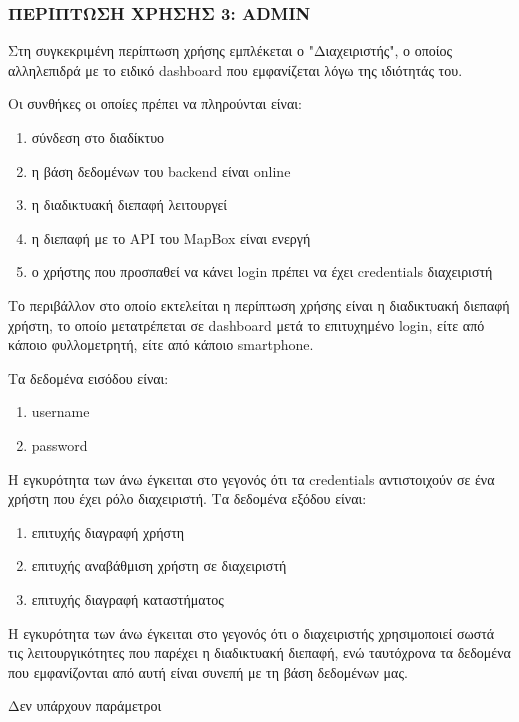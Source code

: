 \subsubsection{ΠΕΡΙΠΤΩΣΗ ΧΡΗΣΗΣ 3: ADMIN}
	
Στη συγκεκριμένη περίπτωση χρήσης εμπλέκεται ο "Διαχειριστής", ο οποίος αλληλεπιδρά με το ειδικό dashboard που εμφανίζεται λόγω της ιδιότητάς του.

Οι συνθήκες οι οποίες πρέπει να πληρούνται είναι:
\begin{enumerate}
	\item σύνδεση στο διαδίκτυο
	\item η βάση δεδομένων του backend είναι online
	\item η διαδικτυακή διεπαφή λειτουργεί
	\item η διεπαφή με το API του MapBox είναι ενεργή
	\item ο χρήστης που προσπαθεί να κάνει login πρέπει να έχει credentials διαχειριστή
\end{enumerate}

Το περιβάλλον στο οποίο εκτελείται η περίπτωση χρήσης είναι η διαδικτυακή διεπαφή χρήστη, το οποίο μετατρέπεται σε dashboard μετά το επιτυχημένο login, είτε από κάποιο φυλλομετρητή, είτε από κάποιο smartphone.

Τα δεδομένα εισόδου είναι:
\begin{enumerate}
	\item username
	\item password
\end{enumerate}
Η εγκυρότητα των άνω έγκειται στο γεγονός ότι τα credentials αντιστοιχούν σε ένα χρήστη που έχει ρόλο διαχειριστή.
Τα δεδομένα εξόδου είναι:
\begin{enumerate}
	\item επιτυχής διαγραφή χρήστη
	\item επιτυχής αναβάθμιση χρήστη σε διαχειριστή
	\item επιτυχής διαγραφή καταστήματος
\end{enumerate}
Η εγκυρότητα των άνω έγκειται στο γεγονός ότι ο διαχειριστής χρησιμοποιεί σωστά τις λειτουργικότητες που παρέχει η διαδικτυακή διεπαφή, ενώ ταυτόχρονα τα δεδομένα που εμφανίζονται από αυτή είναι συνεπή με τη βάση δεδομένων μας.

Δεν υπάρχουν παράμετροι


